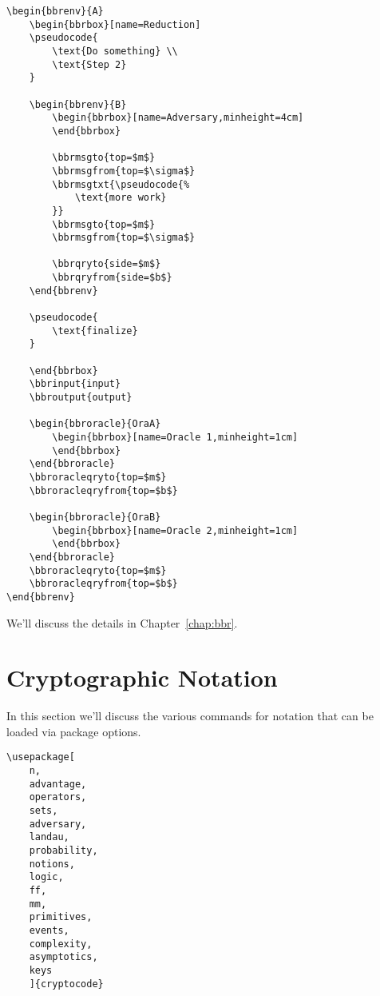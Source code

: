 \documentclass[a4paper]{report}
\begin{document}
\begin{lstlisting}
\begin{bbrenv}{A}
	\begin{bbrbox}[name=Reduction]
	\pseudocode{
		\text{Do something} \\
		\text{Step 2} 
	}

	\begin{bbrenv}{B}
		\begin{bbrbox}[name=Adversary,minheight=4cm]
		\end{bbrbox}

		\bbrmsgto{top=$m$}
		\bbrmsgfrom{top=$\sigma$}
		\bbrmsgtxt{\pseudocode{%
			\text{more work} 
		}}
		\bbrmsgto{top=$m$}
		\bbrmsgfrom{top=$\sigma$}

		\bbrqryto{side=$m$}
		\bbrqryfrom{side=$b$}
	\end{bbrenv}

	\pseudocode{
		\text{finalize} 
	}	

	\end{bbrbox}
	\bbrinput{input}
	\bbroutput{output}

	\begin{bbroracle}{OraA}
		\begin{bbrbox}[name=Oracle 1,minheight=1cm]
		\end{bbrbox}
	\end{bbroracle}
	\bbroracleqryto{top=$m$}
	\bbroracleqryfrom{top=$b$}

	\begin{bbroracle}{OraB}
		\begin{bbrbox}[name=Oracle 2,minheight=1cm]
		\end{bbrbox}
	\end{bbroracle}
	\bbroracleqryto{top=$m$}
	\bbroracleqryfrom{top=$b$}
\end{bbrenv}
\end{lstlisting}
We'll discuss the details in Chapter~\ref{chap:bbr}.

\chapter{Cryptographic Notation}
\label{chap:commands}
In this section we'll discuss the various commands for notation that can be loaded via package options.
\begin{lstlisting}
\usepackage[
	n,
	advantage,
	operators,
	sets,
	adversary,
	landau,
	probability,
	notions,
	logic,
	ff,
	mm,
	primitives,
	events,
	complexity,
	asymptotics,
	keys
	]{cryptocode}
\end{lstlisting}
\end{document}

